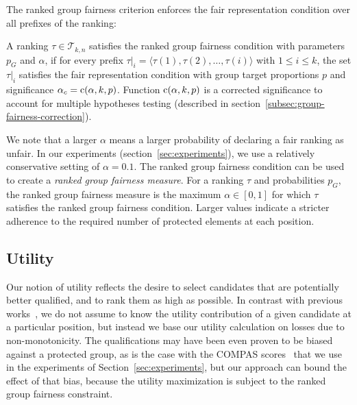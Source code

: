 The ranked group fairness criterion enforces the fair representation condition over all prefixes of the ranking:

\begin{definition}
	\label{def:ranked-group-fairness-condition}
	A ranking $\tau \in {\mathcal T}_{k,n}$ satisfies the ranked group fairness condition with parameters $p_G$ and $\alpha$, if for every prefix $\tau|_i = \langle \tau(1), \tau(2), \dots, \tau(i) \rangle$ with $1 \le i \le k$, the set $\tau|_i$ satisfies the fair representation condition with group target proportions $p$ and significance $\alpha_c = \operatorname{c}(\alpha, k, p)$.
	Function $\operatorname{c}(\alpha, k, p)$ is a corrected significance to account for multiple hypotheses testing (described in section~\ref{subsec:group-fairness-correction}).
\end{definition}

We note that a larger $\alpha$ means a larger probability of declaring a fair ranking as unfair.
%
In our experiments (section~\ref{sec:experiments}), we use a relatively conservative setting of $\alpha=0.1$.
%
The ranked group fairness condition can be used to create a \emph{ranked group fairness measure}. For a ranking $\tau$ and probabilities $p_G$, the ranked group fairness measure is the maximum $\alpha \in [0,1]$ for which $\tau$ satisfies the ranked group fairness condition.
%
Larger values indicate a stricter adherence to the required number of protected elements at each position.

\subsection{Utility}
\label{subsec:individual-fairness}

Our notion of utility reflects the desire to select candidates that are potentially better qualified, and to rank them as high as possible.
%
In contrast with previous works~\cite{yang2016measuring,celis2017ranking}, we do not assume to know the utility contribution of a given candidate at a particular position, but instead we base our utility calculation on losses due to non-monotonicity.
%
The qualifications may have been even proven to be biased against a protected group, as is the case with the COMPAS scores~\cite{angwin_2016_machine} that we use in the experiments of Section~\ref{sec:experiments}, but our approach can bound the effect of that bias, because the utility maximization is subject to the ranked group fairness constraint.

